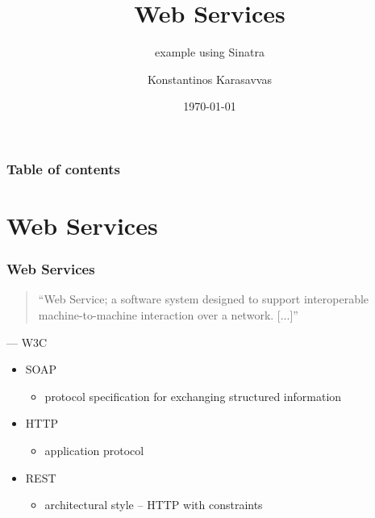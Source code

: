 \documentclass{beamer}
\begin{document}
\title{Web Services}
\subtitle{example using Sinatra}
\author[Konstantinos Karasavvas]{Konstantinos Karasavvas} %

\date{\today} 

\begin{frame}
  \titlepage
\end{frame}

\begin{frame}
\setcounter{tocdepth}{1}
\frametitle{Table of contents}
\tableofcontents
\end{frame} 





\section{Web Services} 
\begin{frame}\frametitle{Web Services} 

  \begin{quote}
``Web Service; a software system designed to support interoperable machine-to-machine interaction over a network. [...]''
  \end{quote}\par\raggedleft--- \textup{W3C}   


  \begin{itemize}
    \item SOAP 
    \begin{itemize}
      \item protocol specification for exchanging structured information
    \end{itemize}

    \item HTTP
    \begin{itemize}
      \item application protocol
    \end{itemize}

    \item REST
    \begin{itemize}
      \item architectural style -- HTTP with constraints
    \end{itemize}


  \end{itemize}
\end{frame}
\end{document}
